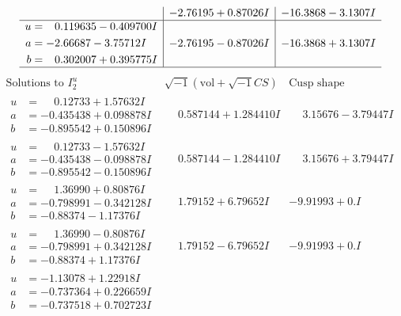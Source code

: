 \documentclass[1p]{elsarticle_modified}
\theoremstyle{definition}
\newcommand{\I}{\sqrt{-1}}
\begin{document}
$$\begin{array}{c|c|c}
 & -2.76195 + 0.87026 I & -16.3868 - 3.1307 I \\ \hline\begin{aligned}
u &= \phantom{-}0.119635 - 0.409700 I \\
a &= -2.66687 - 3.75712 I \\
b &= \phantom{-}0.302007 + 0.395775 I\end{aligned}
 & -2.76195 - 0.87026 I & -16.3868 + 3.1307 I\\
 \hline 
 \end{array}$$\newpage$$\begin{array}{c|c|c}  
\text{Solutions to }I^u_{2}& \I (\text{vol} + \sqrt{-1}CS) & \text{Cusp shape}\\
 \hline 
\begin{aligned}
u &= \phantom{-}0.12733 + 1.57632 I \\
a &= -0.435438 + 0.098878 I \\
b &= -0.895542 + 0.150896 I\end{aligned}
 & \phantom{-}0.587144 + 1.284410 I & \phantom{-}3.15676 - 3.79447 I \\ \hline\begin{aligned}
u &= \phantom{-}0.12733 - 1.57632 I \\
a &= -0.435438 - 0.098878 I \\
b &= -0.895542 - 0.150896 I\end{aligned}
 & \phantom{-}0.587144 - 1.284410 I & \phantom{-}3.15676 + 3.79447 I \\ \hline\begin{aligned}
u &= \phantom{-}1.36990 + 0.80876 I \\
a &= -0.798991 - 0.342128 I \\
b &= -0.88374 - 1.17376 I\end{aligned}
 & \phantom{-}1.79152 + 6.79652 I & -9.91993 + 0. I\phantom{ +0.000000I} \\ \hline\begin{aligned}
u &= \phantom{-}1.36990 - 0.80876 I \\
a &= -0.798991 + 0.342128 I \\
b &= -0.88374 + 1.17376 I\end{aligned}
 & \phantom{-}1.79152 - 6.79652 I & -9.91993 + 0. I\phantom{ +0.000000I} \\ \hline\begin{aligned}
u &= -1.13078 + 1.22918 I \\
a &= -0.737364 + 0.226659 I \\
b &= -0.737518 + 0.702723 I\end{aligned}

\end{array}$$
\end{document}
